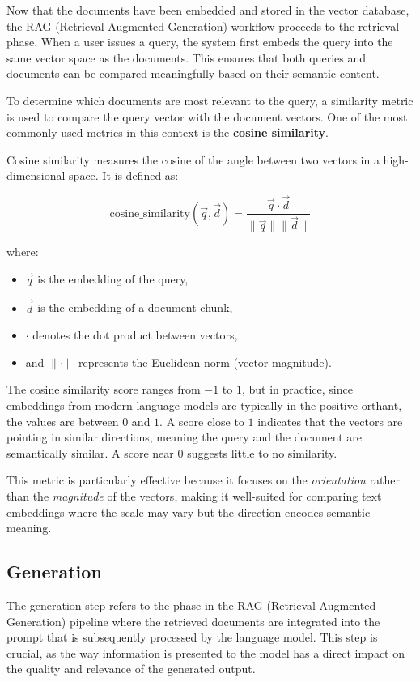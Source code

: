 Now that the documents have been embedded and stored in the vector database, the RAG (Retrieval-Augmented Generation) workflow proceeds to the retrieval phase. When a user issues a query, the system first embeds the query into the same vector space as the documents. This ensures that both queries and documents can be compared meaningfully based on their semantic content.

To determine which documents are most relevant to the query, a similarity metric is used to compare the query vector with the document vectors. One of the most commonly used metrics in this context is the \textbf{cosine similarity}.

Cosine similarity measures the cosine of the angle between two vectors in a high-dimensional space. It is defined as:

\[
\text{cosine\_similarity}(\vec{q}, \vec{d}) = \frac{\vec{q} \cdot \vec{d}}{\|\vec{q}\| \|\vec{d}\|}
\]

where:
\begin{itemize}
    \item $\vec{q}$ is the embedding of the query,
    \item $\vec{d}$ is the embedding of a document chunk,
    \item $\cdot$ denotes the dot product between vectors,
    \item and $\|\cdot\|$ represents the Euclidean norm (vector magnitude).
\end{itemize}

The cosine similarity score ranges from $-1$ to $1$, but in practice, since embeddings from modern language models are typically in the positive orthant, the values are between $0$ and $1$. A score close to $1$ indicates that the vectors are pointing in similar directions, meaning the query and the document are semantically similar. A score near $0$ suggests little to no similarity.

This metric is particularly effective because it focuses on the \textit{orientation} rather than the \textit{magnitude} of the vectors, making it well-suited for comparing text embeddings where the scale may vary but the direction encodes semantic meaning.

    \subsection{Generation}
The generation step refers to the phase in the RAG (Retrieval-Augmented Generation) pipeline where the retrieved documents are integrated into the prompt that is subsequently processed by the language model. This step is crucial, as the way information is presented to the model has a direct impact on the quality and relevance of the generated output.

